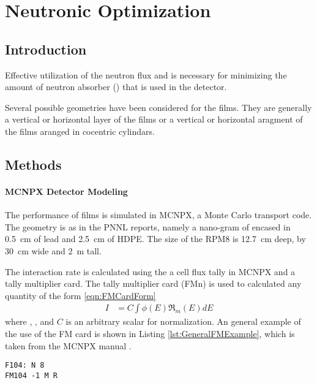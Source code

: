 \chapter{Neutronic Optimization}
\label{ch:GAOpt}
\section{Introduction}
Effective utilization of the neutron flux and is necessary for minimizing the amount of neutron absorber () that is used in the detector.

Several possible geometries have been considered for the films. 
They are generally a vertical or horizontal layer of the films or a vertical or horizontal aragment of the films aranged in cocentric cylindars.
\section{Methods}


\subsubsection{MCNPX Detector Modeling}
\label{sec:MCNPDetectorModelingMethod}
The performance of films is simulated in MCNPX, a Monte Carlo transport code\cite{pelowitz_mcnpx_????}.
The geometry is as in the PNNL reports, namely a nano-gram of   encased in \SI{0.5}{\cm} of lead and \SI{2.5}{\cm} of HDPE. 
The size of the RPM8 is \SI{12.7}{\cm} deep, by \SI{30}{\cm} wide and \SI{2}{\m} tall.

The interaction rate is calculated using the a cell flux tally in MCNPX and a tally multiplier card.
The tally multiplier card (FMn) is used to calculated any quantity of the form \eqref{eqn:FMCardForm} \cite{pelowitz_mcnpx_????}
\begin{align}
  \label{eqn:FMCardForm}
  I &= C\int\phi(E)\Re_m(E)dE
\end{align}
where ,  ,  and $C$ is an arbitrary scalar for normalization.
An general example of the use of the FM card is shown in Listing \ref{lst:GeneralFMExample}, which is taken from the MCNPX manual \cite{pelowitz_mcnpx_????}.
\begin{lstlisting}[caption={[Example usage of the FM card]Example usage of the FM card to calculate the number of reactions per \si{\cm\cubed} of type R in cell 8 of material M. The normalization is by atomic density, signified by the -1},label={lst:GeneralFMExample}]
F104: N 8
FM104 -1 M R
\end{lstlisting}

